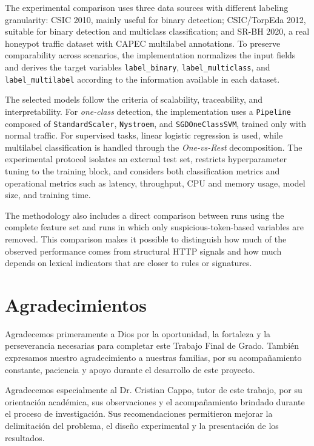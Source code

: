 \documentclass[12pt,oneside]{report}
\begin{document}
The experimental comparison uses three data sources with different labeling granularity: CSIC 2010, mainly useful for binary detection; CSIC/TorpEda 2012, suitable for binary detection and multiclass classification; and SR-BH 2020, a real honeypot traffic dataset with CAPEC multilabel annotations. To preserve comparability across scenarios, the implementation normalizes the input fields and derives the target variables \texttt{label\_binary}, \texttt{label\_multiclass}, and \texttt{label\_multilabel} according to the information available in each dataset.

The selected models follow the criteria of scalability, traceability, and interpretability. For \textit{one-class} detection, the implementation uses a \texttt{Pipeline} composed of \texttt{StandardScaler}, \texttt{Nystroem}, and \texttt{SGDOneClassSVM}, trained only with normal traffic. For supervised tasks, linear logistic regression is used, while multilabel classification is handled through the \textit{One-vs-Rest} decomposition. The experimental protocol isolates an external test set, restricts hyperparameter tuning to the training block, and considers both classification metrics and operational metrics such as latency, throughput, CPU and memory usage, model size, and training time.

The methodology also includes a direct comparison between runs using the complete feature set and runs in which only suspicious-token-based variables are removed. This comparison makes it possible to distinguish how much of the observed performance comes from structural HTTP signals and how much depends on lexical indicators that are closer to rules or signatures.

\chapter*{Agradecimientos}
Agradecemos primeramente a Dios por la oportunidad, la fortaleza y la perseverancia necesarias para completar este Trabajo Final de Grado. También expresamos nuestro agradecimiento a nuestras familias, por su acompañamiento constante, paciencia y apoyo durante el desarrollo de este proyecto.

Agradecemos especialmente al Dr. Cristian Cappo, tutor de este trabajo, por su orientación académica, sus observaciones y el acompañamiento brindado durante el proceso de investigación. Sus recomendaciones permitieron mejorar la delimitación del problema, el diseño experimental y la presentación de los resultados.
\end{document}
